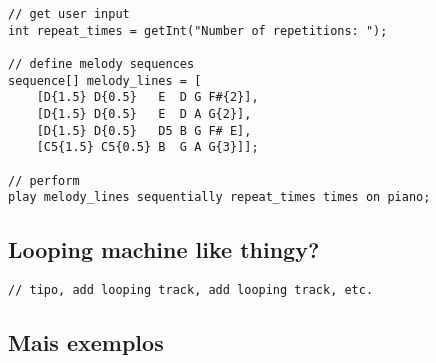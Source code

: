 \documentclass{article}
\begin{document}
\begin{lstlisting}[caption=parabens.principal]
// get user input
int repeat_times = getInt("Number of repetitions: ");

// define melody sequences
sequence[] melody_lines = [
    [D{1.5} D{0.5}   E  D G F#{2}], 
    [D{1.5} D{0.5}   E  D A G{2}],
    [D{1.5} D{0.5}   D5 B G F# E],
    [C5{1.5} C5{0.5} B  G A G{3}]];

// perform
play melody_lines sequentially repeat_times times on piano;
\end{lstlisting}

\subsection{Looping machine like thingy?}
\begin{lstlisting} 
// tipo, add looping track, add looping track, etc.
\end{lstlisting}

\subsection{Mais exemplos}
\begin{lstlisting} 
\end{lstlisting}

% 
% 
\end{document}
